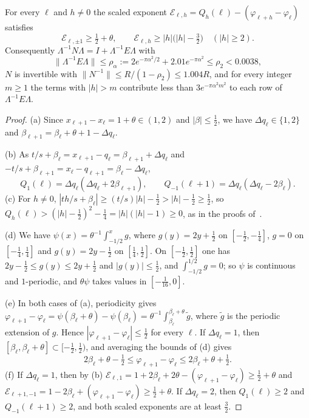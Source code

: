 \begin{lemma}\label{lem:scaled-dominance}
For every $\ell$ and $h\ne0$ the scaled exponent
$\mathcal E_{\ell,h}=Q_h(\ell)-(\varphi_{\ell+h}-\varphi_\ell)$ satisfies
\[
 \mathcal E_{\ell,\pm1}\ge\tfrac12+\theta,\qquad
 \mathcal E_{\ell,h}\ge|h|\bigl(|h|-\tfrac32\bigr)\quad(|h|\ge2).
\]
Consequently $\Lambda^{-1}N\Lambda=I+\Lambda^{-1}E\Lambda$ with
\[
 \|\Lambda^{-1}E\Lambda\|\le\rho_\alpha:=2e^{-\pi\alpha^2/2}+2.01e^{-\pi\alpha^2}
 \le\rho_2<0.0038,
\]
$N$ is invertible with $\|N^{-1}\|\le R/(1-\rho_2)\le1.004R$, and for every
integer $m\ge1$ the terms with $|h|>m$ contribute less than
$3e^{-\pi\alpha^2m^2}$ to each row of $\Lambda^{-1}E\Lambda$.
\end{lemma}

\begin{proof}
(a) Since $x_{\ell+1}-x_\ell=1+\theta\in(1,2)$ and $|\beta|\le\frac12$, we have
$\Delta q_\ell\in\{1,2\}$ and $\beta_{\ell+1}=\beta_\ell+\theta+1-\Delta q_\ell$.

(b) As $t/s+\beta_\ell=x_{\ell+1}-q_\ell=\beta_{\ell+1}+\Delta q_\ell$ and
$-t/s+\beta_{\ell+1}=x_\ell-q_{\ell+1}=\beta_\ell-\Delta q_\ell$,
\[
 Q_1(\ell)=\Delta q_\ell(\Delta q_\ell+2\beta_{\ell+1}),\qquad
 Q_{-1}(\ell+1)=\Delta q_\ell(\Delta q_\ell-2\beta_\ell).
\]
(c) For $h\ne0$, $|th/s+\beta_\ell|\ge(t/s)|h|-\frac12>|h|-\frac12\ge\frac12$,
so $Q_h(\ell)>(|h|-\frac12)^2-\frac14=|h|(|h|-1)\ge0$, as in the proofs
of~\cite[Lemmas~4.6 and~4.11]{HarveyHoeven2021}.

(d) We have $\psi(x)=\theta^{-1}\int_{-1/2}^xg$, where $g(y)=2y+\frac12$ on
$[-\frac12,-\frac14]$, $g=0$ on $[-\frac14,\frac14]$ and $g(y)=2y-\frac12$ on
$[\frac14,\frac12]$. On $[-\frac12,\frac12]$ one has
$2y-\frac12\le g(y)\le2y+\frac12$ and $|g(y)|\le\frac12$, and
$\int_{-1/2}^{1/2}g=0$; so $\psi$ is continuous and $1$-periodic, and
$\theta\psi$ takes values in $[-\frac1{16},0]$.

(e) In both cases of (a), periodicity gives
$\varphi_{\ell+1}-\varphi_\ell=\psi(\beta_\ell+\theta)-\psi(\beta_\ell)
=\theta^{-1}\int_{\beta_\ell}^{\beta_\ell+\theta}\tilde g$, where $\tilde g$ is
the periodic extension of $g$. Hence
$|\varphi_{\ell+1}-\varphi_\ell|\le\frac12$ for every $\ell$. If
$\Delta q_\ell=1$, then $[\beta_\ell,\beta_\ell+\theta]\subset[-\frac12,\frac12)$,
and averaging the bounds of (d) gives
\[
 2\beta_\ell+\theta-\tfrac12\le\varphi_{\ell+1}-\varphi_\ell\le2\beta_\ell+\theta+\tfrac12 .
\]
(f) If $\Delta q_\ell=1$, then by (b)
$\mathcal E_{\ell,1}=1+2\beta_\ell+2\theta-(\varphi_{\ell+1}-\varphi_\ell)\ge\frac12+\theta$
and $\mathcal E_{\ell+1,-1}=1-2\beta_\ell+(\varphi_{\ell+1}-\varphi_\ell)\ge\frac12+\theta$.
If $\Delta q_\ell=2$, then $Q_1(\ell)\ge2$ and $Q_{-1}(\ell+1)\ge2$, and both
scaled exponents are at least $\frac32$.


\end{proof}
